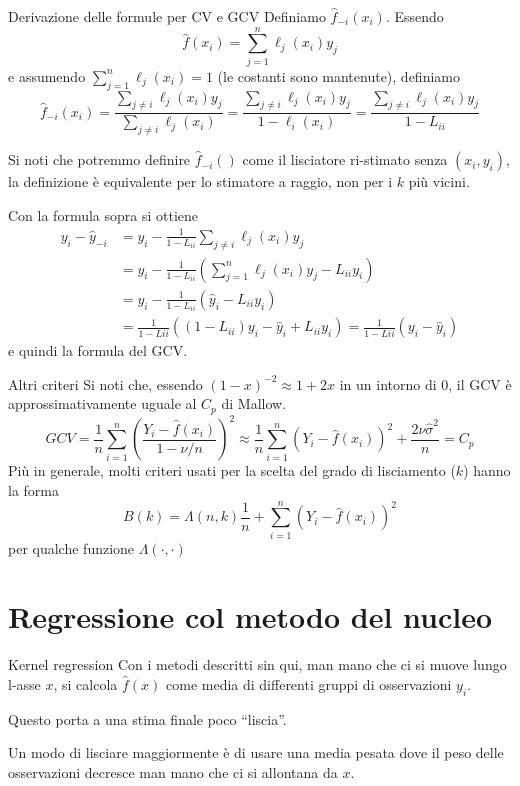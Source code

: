 \documentclass{beamer}
\newcommand{\spazio}{\noindent\makebox[\linewidth]{\resizebox{0.1\linewidth}{1pt}{{$\bullet$}}}}
\begin{document}
\begin{frame}[allowframebreaks=0.95]{Derivazione delle formule per CV e GCV}
Definiamo $\hat{f}_{-i}(x_i)$. Essendo
\[
\hat{f}(x_i) = \sum_{j=1}^n \ell_j(x_i) y_j
\]
e assumendo $\sum_{j=1}^n \ell_j(x_i)=1$ (le costanti sono mantenute), definiamo
\[
\hat{f}_{-i}(x_i) = \frac{\sum_{j\neq i} \ell_j(x_i) y_j}{\sum_{j\neq i} \ell_j(x_i) } = \frac{\sum_{j\neq i} \ell_j(x_i) y_j}{1- \ell_i(x_i) }= \frac{\sum_{j\neq i} \ell_j(x_i) y_j}{1- L_{ii} }
\]

\spazio

Si noti che potremmo definire $\hat{f}_{-i}()$ come il lisciatore ri-stimato senza  $(x_i,y_i)$, la definizione \`e equivalente per lo stimatore a raggio, non per i $k$ pi\`u vicini.

\break

Con la formula sopra si ottiene
\begin{align*}
y_i-\hat{y}_{-i} 
&= y_i - \frac{1}{1-L_{ii}} \sum_{j\neq i} \ell_j(x_i) y_j \\
&= y_i - \frac{1}{1-L_{ii}} \left(\sum_{j=1}^n \ell_j(x_i) y_j - L_{ii}y_i\right) \\
&= y_i - \frac{1}{1-L_{ii}} \left(\hat{y}_i - L_{ii}y_i\right) \\
&= \frac{1}{1-L{ii}} \left((1-L_{ii})y_i - \hat{y}_i + L_{ii}y_i\right) = \frac{1}{1-L{ii}}(y_i-\hat{y}_i) 
\end{align*}
e quindi la formula del GCV.


\end{frame}


\begin{frame}{Altri criteri}
Si noti che, essendo $(1-x)^{-2}\approx 1+2x$ in un intorno di $0$, il GCV \`e approssimativamente uguale al $C_p$ di Mallow.
\[ 
GCV = \frac{1}{n} \sum_{i=1}^n\left(\frac{Y_i-\hat{f}(x_i)}{1-\nu/n}\right)^2
\approx \frac{1}{n} \sum_{i=1}^n\left(Y_i-\hat{f}(x_i)\right)^2 + \frac{2\nu\hat{\sigma}^2}{n} = C_p
\]
Pi\`u in generale, molti criteri usati per la scelta del grado di lisciamento ($k$) hanno la forma
\[
B(k) = \Lambda(n,k)\frac{1}{n} + \sum_{i=1}^n\left(Y_i-\hat{f}(x_i)\right)^2 
\]
per qualche funzione $\Lambda(\cdot,\cdot)$
\end{frame}

\section[Nucleo]{Regressione col metodo del nucleo}

\begin{frame}{Kernel regression}
Con i metodi descritti sin qui, man mano che ci si muove lungo l-asse $x$, si calcola $\hat{f}(x)$ come media di differenti gruppi di osservazioni $y_i$.

\spazio

Questo porta a una stima finale poco ``liscia''.

\spazio

Un modo di lisciare maggiormente \`e di usare una media pesata dove il peso delle osservazioni decresce man mano che ci si allontana da $x$.
\end{frame}
\end{document}
